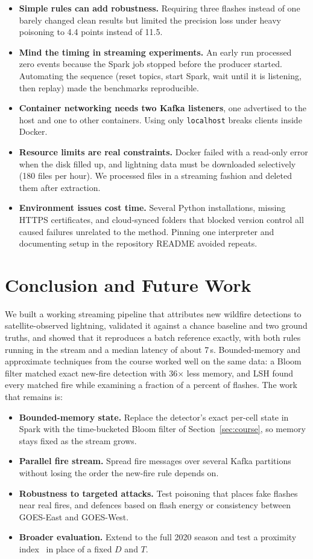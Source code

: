 \documentclass[10pt,journal,compsoc]{IEEEtran}
\begin{document}
\begin{itemize}
\item \textbf{Simple rules can add robustness.} Requiring three flashes instead of one barely changed clean results but limited the precision loss under heavy poisoning to 4.4 points instead of 11.5.
\item \textbf{Mind the timing in streaming experiments.} An early run processed zero events because the Spark job stopped before the producer started. Automating the sequence (reset topics, start Spark, wait until it is listening, then replay) made the benchmarks reproducible.
\item \textbf{Container networking needs two Kafka listeners}, one advertised to the host and one to other containers. Using only \texttt{localhost} breaks clients inside Docker.
\item \textbf{Resource limits are real constraints.} Docker failed with a read-only error when the disk filled up, and lightning data must be downloaded selectively (180 files per hour). We processed files in a streaming fashion and deleted them after extraction.
\item \textbf{Environment issues cost time.} Several Python installations, missing HTTPS certificates, and cloud-synced folders that blocked version control all caused failures unrelated to the method. Pinning one interpreter and documenting setup in the repository README avoided repeats.
\end{itemize}

\section{Conclusion and Future Work}\label{sec:future}
We built a working streaming pipeline that attributes new wildfire detections to satellite-observed lightning, validated it against a chance baseline and two ground truths, and showed that it reproduces a batch reference exactly, with both rules running in the stream and a median latency of about 7\,s. Bounded-memory and approximate techniques from the course worked well on the same data: a Bloom filter matched exact new-fire detection with 36$\times$ less memory, and LSH found every matched fire while examining a fraction of a percent of flashes. The work that remains is:
\begin{itemize}
\item \textbf{Bounded-memory state.} Replace the detector's exact per-cell state in Spark with the time-bucketed Bloom filter of Section~\ref{sec:course}, so memory stays fixed as the stream grows.
\item \textbf{Parallel fire stream.} Spread fire messages over several Kafka partitions without losing the order the new-fire rule depends on.
\item \textbf{Robustness to targeted attacks.} Test poisoning that places fake flashes near real fires, and defences based on flash energy or consistency between GOES-East and GOES-West.
\item \textbf{Broader evaluation.} Extend to the full 2020 season and test a proximity index~\cite{larjavaara2005finland} in place of a fixed $D$ and $T$.
\end{itemize}
\end{document}
